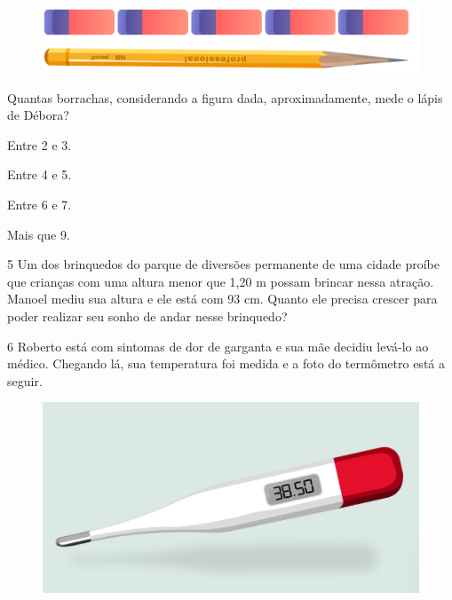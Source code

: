\begin{figure}[htpb!]
\centering
\includegraphics[width=\textwidth]{../ilustracoes/MAT5/SAEB_5ANO_MAT_figura32.png}
\end{figure}

Quantas borrachas, considerando a figura dada, aproximadamente, mede o
lápis de Débora?

\begin{escolha}
\item
  Entre 2 e 3.
\item
  Entre 4 e 5. 
\item
  Entre 6 e 7.
\item
  Mais que 9.
\end{escolha}

\num{5} Um dos brinquedos do parque de diversões permanente de uma cidade
proíbe que crianças com uma altura menor que 1,20 m possam brincar nessa
atração. Manoel mediu sua altura e ele está com 93 cm. Quanto ele
precisa crescer para poder realizar seu sonho de andar nesse brinquedo?

\begin{mdframed}[linewidth=2pt,linecolor=salmao]
\mbox{}\vspace*{8cm}
\end{mdframed}

\pagebreak
\num{6} Roberto está com sintomas de dor de garganta e sua mãe decidiu levá-lo ao
médico. Chegando lá, sua temperatura foi medida e a foto do termômetro
está a seguir.

\begin{figure}[htpb!]
\centering
\includegraphics[width=\textwidth]{./imgs/mat4.png}
\end{figure}

